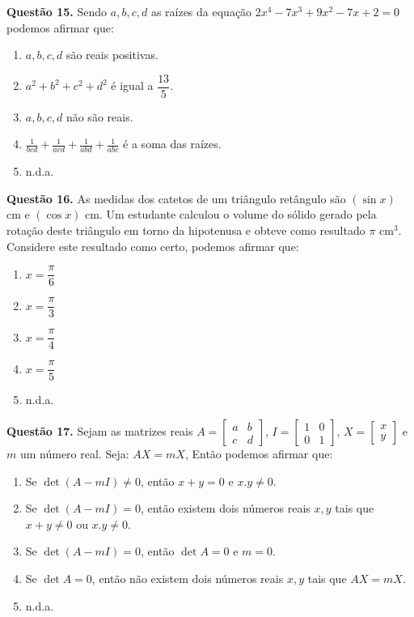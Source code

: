 \documentclass[11pt]{article}
\begin{document}
\newpage

\textbf{Questão 15.} Sendo $a, b, c, d$ as raízes da equação $2x^4 - 7x^3 + 9x^2 - 7x + 2 = 0$ podemos afirmar que:

\begin{enumerate}[\bf A (\quad)]
    \item $a, b, c, d$ são reais positivas.
    \item $a^2 + b^2 + c^2 + d^2$ é igual a $\dfrac{13}{5}$.
    \item $a, b, c, d$ não são reais.
    \item $\displaystyle \frac{1}{bcd} + \frac{1}{acd} + \frac{1}{abd} + \frac{1}{abc}$ é a soma das raízes.
    \item n.d.a.
\end{enumerate}

\textbf{Questão 16.} As medidas dos catetos de um triângulo retângulo são $(\sin x)$ cm e $(\cos x)$ cm. Um estudante calculou o volume do sólido gerado pela rotação deste triângulo em torno da hipotenusa e obteve como resultado $\pi$ cm$^3$. Considere este resultado como certo, podemos afirmar que:

\begin{multicols}{5}
    \begin{enumerate}[\bf A (\quad)]
        \item $x = \dfrac{\pi}{6}$
        \item $x = \dfrac{\pi}{3}$
        \item $x = \dfrac{\pi}{4}$
        \item $x = \dfrac{\pi}{5}$
        \item n.d.a.
    \end{enumerate}
\end{multicols}

\textbf{Questão 17.} Sejam as matrizes reais $A = \begin{bmatrix} a & b \\ c & d \end{bmatrix}$, $I = \begin{bmatrix} 1 & 0 \\ 0 & 1 \end{bmatrix}$, $X = \begin{bmatrix} x \\ y \end{bmatrix}$ e $m$ um número real. Seja: $AX = mX$, Então podemos afirmar que: 

\begin{enumerate}[\bf A (\quad)]
    \item Se $\det (A - mI) \neq 0$, então $x + y = 0$ e $x.y \neq 0$.
    \item Se $\det (A - mI) = 0$, então existem dois números reais $x, y$ tais que $x + y \neq 0$ ou $x.y \neq 0$.
    \item Se $\det (A - mI) = 0$, então $\det A = 0$ e $m = 0$.
    \item Se $\det A = 0$, então não existem dois números reais $x, y$ tais que $AX = mX$.
    \item n.d.a.
\end{enumerate}
\end{document}
